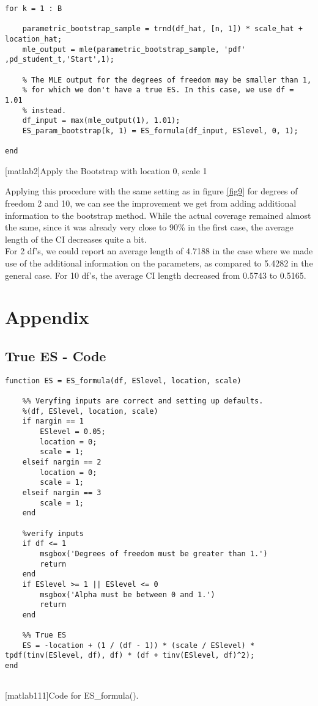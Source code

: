 \documentclass[11pt, a4paper]{article}
\begin{document}
\begin{lstlisting}[style=Matlab-editor]
for k = 1 : B
	
	parametric_bootstrap_sample = trnd(df_hat, [n, 1]) * scale_hat + location_hat;
	mle_output = mle(parametric_bootstrap_sample, 'pdf' ,pd_student_t,'Start',1);
	
	% The MLE output for the degrees of freedom may be smaller than 1,     
	% for which we don't have a true ES. In this case, we use df = 1.01
	% instead.
	df_input = max(mle_output(1), 1.01);                                        
	ES_param_bootstrap(k, 1) = ES_formula(df_input, ESlevel, 0, 1);
	
end
\end{lstlisting}
\label{MLE location 0 scale 1 bootstrap}
[matlab2]{Apply the Bootstrap with location 0, scale 1\\} 


Applying this procedure with the same setting as in figure \ref{fig9} for degrees of freedom 2 and 10, we can see the improvement we get from adding additional information to the bootstrap method. While the actual coverage remained almost the same, since it was already very close to 90\% in the first case, the average length of the CI decreases quite a bit. \\

For 2 df's, we could report an average length of 4.7188 in the case where we made use of the additional information on the parameters, as compared to 5.4282 in the general case. For 10 df's, the average CI length decreased from 0.5743 to 0.5165.

\clearpage
\section{Appendix}
\subsection{True ES - Code}
\begin{lstlisting}[style=Matlab-editor]
function ES = ES_formula(df, ESlevel, location, scale)
   
    %% Veryfing inputs are correct and setting up defaults.
    %(df, ESlevel, location, scale)
    if nargin == 1
        ESlevel = 0.05;
        location = 0;
        scale = 1;
    elseif nargin == 2
        location = 0;
        scale = 1;
    elseif nargin == 3
        scale = 1;
    end
    
    %verify inputs
    if df <= 1
        msgbox('Degrees of freedom must be greater than 1.')
        return
    end
    if ESlevel >= 1 || ESlevel <= 0
        msgbox('Alpha must be between 0 and 1.')
        return
    end
    
    %% True ES
    ES = -location + (1 / (df - 1)) * (scale / ESlevel) * tpdf(tinv(ESlevel, df), df) * (df + tinv(ESlevel, df)^2);
end


\end{lstlisting}
\label{matlab111}
[matlab111]{Code for ES\_formula().}
\end{document}
